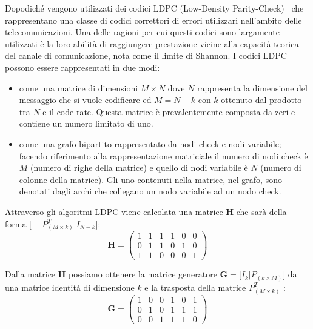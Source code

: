 Dopodich\'e vengono utilizzati dei codici LDPC (Low-Density Parity-Check)~\cite{borwankar_low_nodate} che rappresentano una classe di codici correttori di errori utilizzari nell'ambito delle telecomunicazioni. Una delle ragioni per cui questi codici sono largamente utilizzati \`e la loro abilit\`a di raggiungere prestazione vicine alla capacit\`a teorica del canale di comunicazione, nota come il limite di Shannon. I codici LDPC possono essere rappresentati in due modi:
\begin{itemize}
\item come una matrice di dimensioni $M \times N$ dove $N$ rappresenta la dimensione del messaggio che si vuole codificare ed $M = N - k$ con $k$ ottenuto dal prodotto tra $N$ e il code-rate. Questa matrice \`e prevalentemente composta da zeri e contiene un numero limitato di uno.
\item come una grafo bipartito rappresentato da nodi check e nodi variabile; facendo riferimento alla rappresentazione matriciale il numero di nodi check \`e $M$ (numero di righe della matrice) e quello di nodi variabile \`e $N$ (numero di colonne della matrice). Gli uno contenuti nella matrice, nel grafo, sono denotati dagli archi che collegano un nodo variabile ad un nodo check.
\end{itemize}

Attraverso gli algoritmi LDPC viene calcolata una matrice \textbf{H} che sar\`a della forma $\bigl [ -P^T_{(M \times k)} | I_{N-k}\bigr ]$:
\begin{equation}
\textbf{H} =
\begin{pmatrix}
 1 & 1 & 1 & 1 & 0 & 0 \\
 0 & 1 & 1 & 0 & 1 & 0 \\
 1 & 1 & 0 & 0 & 0 & 1
\end{pmatrix}
\end{equation}

Dalla matrice \textbf{H} possiamo ottenere la matrice generatore $\textbf{G} = \bigl [  I_{k} | P_{(k \times M)} \bigr ]$ da una matrice identit\`a di dimensione $k$ e la trasposta della matrice $P^T_{(M \times k)}$ :
\begin{equation}
\textbf{G} =
\begin{pmatrix}
 1 & 0 & 0 & 1 & 0 & 1 \\
 0 & 1 & 0 & 1 & 1 & 1 \\
 0 & 0 & 1 & 1 & 1 & 0
\end{pmatrix}
\end{equation}

